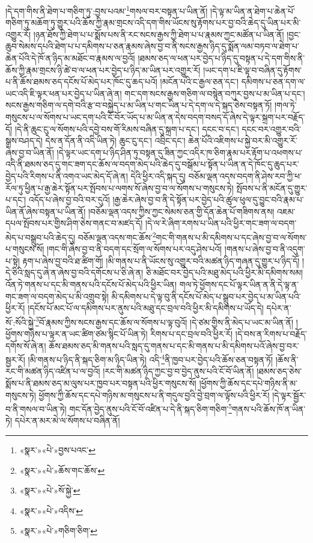 །དེ་དག་གིས་ནི་ཐེག་པ་གཅིག་ཏུ་:བྱས་པའམ་\footnote{«སྣར་»«པེ་»བྱས་པའང་}གསལ་བར་བསྟན་པ་ཡིན་ནོ། །དེ་ལྟ་མ་ཡིན་ན་ཐེག་པ་ཆེན་པོ་གཅིག་ཏུ་མཆོག་ཏུ་གྱུར་པའི་ཆོས་ཀྱི་རྣམ་གྲངས་འདི་དག་གིས་ཡོངས་སུ་རྟོགས་པར་བྱ་བའི་ཆེད་དུ་ཡིན་པར་མི་འགྱུར་རོ། །ཉན་ཐོས་ཀྱི་ཐེག་པ་པ་སྨོས་པས་ནི་རང་སངས་རྒྱས་ཀྱི་ཐེག་པ་པ་རྣམས་ཀྱང་མཚོན་པ་ཡིན་ནོ། །བྱང་ཆུབ་སེམས་དཔའི་ཐེག་པ་པ་དམིགས་པ་ཅན་རྣམས་ཞེས་བྱ་བ་ནི་སངས་རྒྱས་ཉིད་དུ་སྨོན་ལམ་བཏབ་ལ་ཐེག་པ་ཆེན་པོའི་དེ་ཁོ་ན་ཉིད་མ་མཐོང་བ་རྣམས་ལ་བྱའོ། །ཐམས་ཅད་ལ་ཕན་པར་བྱེད་པ་ཉིད་དུ་བསྟན་པ་དེ་དག་གིས་ནི་ཆོས་ཀྱི་རྣམ་གྲངས་ཉི་ཚེ་བ་ལ་ཕན་པར་བྱེད་པ་ཉིད་མ་ཡིན་པར་འགྱུར་རོ། །ཡང་དག་པ་ཇི་ལྟ་བ་བཞིན་དུ་རྟོགས་པ་ནི་ཆོས་ཐམས་ཅད་དངོས་པོ་མེད་པར་ཁོང་དུ་ཆད་པའོ། །མངོན་པའི་ང་རྒྱལ་ཅན་དང་། དམིགས་པ་ཅན་དག་ལ་ཡང་འདི་ཇི་ལྟར་ཕན་པར་བྱེད་པ་ཡིན་ཞེ་ན། གང་དག་སངས་རྒྱས་གཅིག་ལ་བསྙེན་བཀུར་བྱས་པ་མ་ཡིན་པ་དང་། སངས་རྒྱས་གཅིག་ལ་དགེ་བའི་རྩ་བ་བསྐྱེད་པ་མ་ཡིན་པ་གང་ཡིན་པ་དེ་དག་ལ་དེ་སྐད་ཅེས་བསྟན་ཏོ། །གལ་ཏེ་གསུངས་པ་ལ་སོགས་པ་ཡང་དག་པའི་ངོ་བོར་ཡོད་པ་མ་ཡིན་ན་དེས་བདག་བསད་དོ་ཞེས་དེ་ལྟར་སྐྲག་པར་བརྗོད་དོ། །དེ་ནི་ཆུང་ངུ་ལ་སོགས་པའི་དབྱེ་བས་གོ་རིམས་བཞིན་དུ་སྐྲག་པ་དང་། དངང་བ་དང་། དངང་བར་འགྱུར་བའི་སྒྲས་བཤད་དེ། དེས་ན་དོན་ནི་འདི་ཡིན་ཏེ། ཆུང་ངུ་དང་། འབྲིང་དང་། ཆེན་པོའི་འཇིགས་པ་སྐྱེ་བར་མི་འགྱུར་རོ་ཞེས་བྱ་བ་ཡིན་ནོ། །དེ་ལྟར་ཡང་དག་པ་ཉིད་ཤིན་ཏུ་བསྟན་དུ་ཟིན་ཀྱང་འདིར་ཁ་ཅིག་རྣམ་པར་རྟོག་པ་འཕགས་པ་འདི་ནི་ཐམས་ཅད་དུ་གང་ཟག་དང་ཆོས་ལ་བདག་མེད་པའི་ཆེད་དུ་བསྒོམ་པ་སྟོན་པ་ཡིན་ན་དེ་ཁོང་དུ་ཆུད་པར་བྱེད་པའི་རིགས་པ་ནི་འགའ་ཡང་མེད་དོ་ཞེ་ན། དེའི་ཕྱིར་འདི་སྐད་དུ། བཅོམ་ལྡན་འདས་བདག་ནི་ཤེས་རབ་ཀྱི་ཕ་རོལ་ཏུ་ཕྱིན་པ་རྒྱ་ཆེར་སྟོན་པར་སྤོབས་པ་ལགས་སོ་ཞེས་བྱ་བ་ལ་སོགས་པ་གསུངས་ཏེ། སྤོབས་པ་ནི་མངོན་དུ་གྱུར་པ་དང་། འདོད་པ་ཞེས་བྱ་བའི་བར་དུའོ། །རྒྱ་ཆེར་ཞེས་བྱ་བ་ནི་དེ་སྟོན་པར་བྱེད་པའི་ཚུལ་ཕུལ་དུ་བྱུང་བའི་རྣམ་པ་ཡིན་ནོ་ཞེས་བསྟན་པ་ཡིན་ནོ། །བཅོམ་ལྡན་འདས་ཀྱིས་ཀྱང་སེམས་ཅན་གྱི་དོན་ཆེན་པོ་གཟིགས་ནས། འཇམ་དཔལ་སྤོབས་པར་གྱིས་ཤིག་ཅེས་གནང་བ་མཛད་དོ། །དེ་ལ་རེ་ཞིག་རགས་པ་ཡིན་པའི་ཕྱིར་གང་ཟག་ལ་བདག་མེད་པ་བསྒྲུབ་པའི་ཆེད་དུ། བཅོམ་ལྡན་འདས་གང་ཆོས་\footnote{«སྣར་»«པེ་»ཆོས་གང་ཆོས་}གང་གི་གནས་པ་མི་དམིགས་པ་དང་ཞེས་བྱ་བ་ལ་སོགས་པ་གསུངས་སོ། །གང་གི་ཞེས་བྱ་བ་ནི་བདག་དང་སྲོག་ལ་སོགས་པར་འདུ་ཤེས་པའོ། །གནས་པ་ཞེས་བྱ་བ་ནི་འདུག་པ་སྟེ། རྟག་པ་ཞེས་བྱ་བའི་ཐ་ཚིག་གོ། །མི་གནས་པ་ནི་ཡོངས་སུ་འགྱུར་བའི་མཚན་ཉིད་གཞན་དུ་གྱུར་པ་ཉིད་དོ། །དེ་ཅིའི་སླད་དུ་ཞེ་ན་ཞེས་བྱ་བའི་དགོངས་པ་ཅི་ཞེ་ན། ཅི་མཐོང་བར་བྱེད་པའི་མཐུ་མེད་པའི་ཕྱིར་མི་དམིགས་སམ། འོན་ཏེ་གནས་པ་དང་མི་གནས་པའི་དངོས་པོ་མེད་པའི་ཕྱིར་ཡིན། གལ་ཏེ་ཕྱོགས་དང་པོ་ལྟར་ཡིན་ན་ནི་དེ་ལྟ་ན་གང་ཟག་ལ་བདག་མེད་པ་མི་འགྲུབ་སྟེ། མི་དམིགས་པ་དེ་ལྟ་བུ་ནི་དངོས་པོ་མེད་པ་སྒྲུབ་པར་བྱེད་པ་མ་ཡིན་པའི་ཕྱིར་རོ། །དངོས་པོ་མང་པོ་ལ་དམིགས་པར་ནུས་པའི་མཐུ་དང་བྲལ་བའི་ཕྱིར་མི་དམིགས་པ་ཡོད་དེ། དཔེར་ན་སོ་:སོའི་སྐྱེ་\footnote{«སྣར་»«པེ་»སོ་སྐྱེ་}བོ་རྣམས་ཀྱིས་སངས་རྒྱས་དང་ཆོས་ལ་སོགས་པ་ལྟ་བུའོ། །དེ་ཙམ་གྱིས་ནི་མེད་པ་ཡང་མ་ཡིན་ནོ། །ཕྱོགས་གཉིས་པ་ལྟར་ན་ཡང་ཚིག་ཙམ་སྙིང་པོ་ཡིན་ཏེ། རིགས་པ་དང་བྲལ་བའི་ཕྱིར་རོ། །དེ་བས་ན་རིགས་པ་བརྗོད་དགོས་སོ་ཞེ་ན། ཆོས་ཐམས་ཅད་མི་གནས་པའི་སླད་དུ་གནས་པ་དང་མི་གནས་པ་མི་དམིགས་པའོ་ཞེས་བྱ་བར་སྦྱར་རོ། །མི་གནས་པ་ཉིད་ནི་སྐད་ཅིག་མ་ཉིད་ཡིན་ཏེ། འདི་\footnote{«སྣར་»«པེ་»འདིས་}ནི་ཁྱབ་པར་བྱེད་པའི་ཆོས་ཅན་བསྟན་ཏོ། །ཆོས་ནི་རང་གི་མཚན་ཉིད་འཛིན་པ་ལ་བྱའོ། །རང་གི་མཚན་ཉིད་ཀྱང་བྱ་བ་བྱེད་ནུས་པའི་ངོ་བོ་ཡིན་ནོ། །ཐམས་ཅད་ཅེས་སྨོས་པ་ནི་ཐམས་ཅད་མ་ལུས་པར་ཁྱབ་པར་བསྟན་པའི་ཕྱིར་གསུངས་སོ། །ཕྱོགས་ཀྱི་ཆོས་དང་དཔེ་གཉིས་ནི་མ་གསུངས་ཏེ། ཕྱོགས་ཀྱི་ཆོས་དང་དཔེ་གཉིས་མ་གསུངས་པ་ནི་གདུལ་བྱའི་བྱེ་བྲག་ལ་ལྟོས་པའི་ཕྱིར་རོ། །དེ་ལྟར་སྦྱོར་བ་ནི་གསལ་བ་ཡིན་ཏེ། གང་དོན་བྱེད་ནུས་པའི་ངོ་བོ་འཛིན་པ་དེ་ནི་སྐད་ཅིག་གཅིག་\footnote{«སྣར་»«པེ་»གཅིག་ཅིག་}གནས་པའི་ཆོས་ཁོ་ན་ཡིན་ཏེ། དཔེར་ན་མར་མེ་ལ་སོགས་པ་བཞིན་ནོ། 